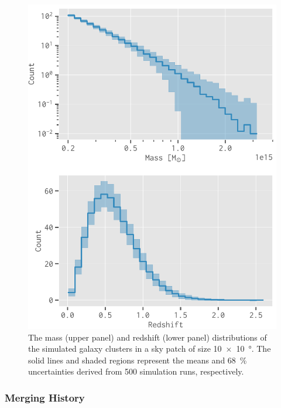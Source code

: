 \documentclass[twocolumn]{aastex62}
\newcommand{\editone}[1]{{\leavevmode\color{cyan}#1}}
\begin{document}
\begin{figure}
  \centering
  \includegraphics[width=\columnwidth]{mass-z-dist}
  \caption{\label{fig:m-z-dist}\editone{%
    The mass (upper panel) and redshift (lower panel) distributions of the
    simulated galaxy clusters in a sky patch of size
    \SI[product-units=repeat]{10 x 10}{\degree}.
    The solid lines and shaded regions represent the means and
    \SI{68}{\percent} uncertainties derived from 500 simulation runs,
    respectively.
  }}
\end{figure}

\subsubsection{Merging History}
\label{sec:merging-history}
\end{document}
